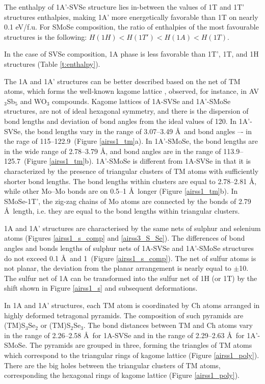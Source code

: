 \documentclass[a4paperm]{article}
\begin{document}
The enthalpy of 1A'-SVSe structure lies in-between the values of 1T and 1T' structures enthalpies, making 1A' more energetically favorable than 1T on nearly 0.1 eV/f.u.
For SMoSe composition, the ratio of enthalpies of the most favourable structures is the following: 
$H(1H) < H(1T') < H(1A) < H (1T)$.

In the case of SVSe composition, 1A phase is less favorable than 1T', 1T, and 1H structures (Table \ref{t:enthalpy}).

The 1A and 1A' structures can be better described based on the net of TM atoms, which forms the well-known kagome lattice \cite{zhang2021_kagome}, observed, for instance, in AV$_3$Sb$_5$ \cite{ortiz2021} and WO$_3$ \cite{gerand1979} compounds.
Kagome lattices of 1A-SVSe and 1A'-SMoSe structures, are not of ideal hexagonal symmetry, and there is the dispersion of bond lengths and deviation of bond angles from the ideal values of 120\textdegree.
In 1A'-SVSe, the bond lengths vary in the range of 3.07--3.49 \AA\ and bond angles –- in the rage of 115--122.9\textdegree\ (Figure \ref{airss1_tm}a).
In 1A'-SMoSe, the bond lengths are in the wide range of 2.78--3.79 \AA, and bond angles are in the range of 113.9--125.7\textdegree\ (Figure \ref{airss1_tm}b).
1A'-SMoSe is different from 1A-SVSe in that it is characterized by the presence of triangular clusters of TM atoms with sufficiently shorter bond lengths.
The bond lengths within clusters are equal to 2.78--2.81 \AA, while other Mo--Mo bonds are on 0.5--1 \AA\ longer (Figure \ref{airss1_tm}b).
In SMoSe-1T', the zig-zag chains of Mo atoms are connected by the bonds of 2.79 \AA\ length, i.e. they are equal to the bond lengths within triangular clusters.

1A and 1A' structures are characterised by the same nets of sulphur and selenium atoms (Figures \ref{airss1_s_comp} and \ref{airss3_S_Se}). 
The differences of bond angles and bonds lengths of sulphur nets of 1A-SVSe and 1A'-SMoSe structures do not exceed 0.1 \AA\ and 1\textdegree\ (Figure \ref{airss1_s_comp}).
The net of sulfur atoms is not planar, the deviation from the planar arrangement is nearly equal to $\pm$10\textdegree.
The sulfur net of 1A can be transformed into the sulfur net of 1H (or 1T) by the shift shown in Figure \ref{airss1_s} and subsequent deformations.


In 1A and 1A' structures, each TM atom is coordinated by Ch atoms arranged in highly deformed tetragonal pyramids.
The composition of such pyramids are (TM)S$_3$Se$_2$ or (TM)S$_2$Se$_3$.
The bond distances between TM and Ch atoms vary in the range of 2.26--2.58 \AA\ for 1A-SVSe and in the range of 2.29--2.63 \AA\ for 1A'-SMoSe. 
The pyramids are grouped in three, forming the triangles of TM atoms which correspond to the triangular rings of kagome lattice (Figure \ref{airss1_poly}).
There are the big holes between the triangular clusters of TM atoms, corresponding the hexagonal rings of kagome lattice (Figure \ref{airss1_poly}).
\end{document}

